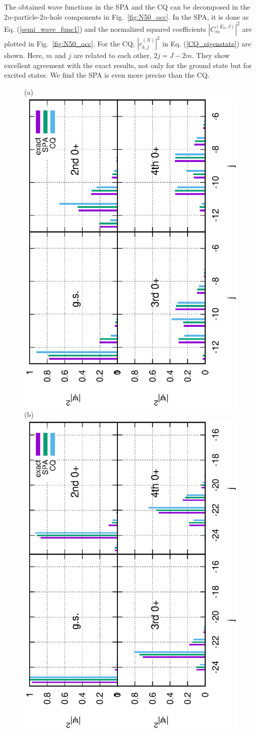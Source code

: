 \documentclass[%
superscriptaddress,
preprint,
showpacs,
nofootinbib,
amsmath,amssymb,
aps,
prc,
floatfix ]%
{revtex4-1}
\begin{document}
The obtained wave functions in the SPA and the CQ can be decomposed in the
$2n$-particle-$2n$-hole components in Fig.~\ref{fig:N50_occ}.
In the SPA, it is done as Eq. (\ref{semi_wave_func1}) and
the normalized squared coefficients $|C_m^{(E_k,J)}|^2$ are plotted
in Fig.~\ref{fig:N50_occ}.
For the CQ, $|c_{k,j}^{(N)}|^2$ in Eq. (\ref{CQ_eigenstate}) are shown.
Here, $m$ and $j$ are related to each other, $2j=J-2m$.
They show excellent agreement with the exact results, not only for the
ground state but for excited states.
We find the SPA is even more precise than the CQ.
\begin{figure}[t]
 \begin{minipage}{1\hsize}
 \begin{center}
(a)\includegraphics[height=0.45\textwidth,angle=-90]{N50Xeq0p5occ_wo_adiabatic.eps}
(b)\includegraphics[height=0.45\textwidth,angle=-90]{N100Xeq0p5occ_wo_adiabatic.eps}
 \end{center}
 \end{minipage}
 \begin{minipage}{1\hsize}
 \begin{center}

\end{center}
\end{minipage}
\end{figure}
\end{document}
